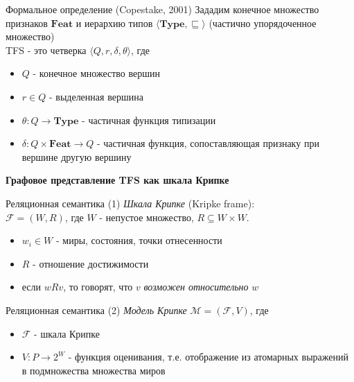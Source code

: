 \documentclass{beamer}
\begin{document}
\begin{frame}{Формальное определение (Copestake, 2001)}
Зададим конечное множество признаков $\textbf{Feat}$ и иерархию типов $\langle \textbf{Type}, \sqsubseteq \rangle$ (частично упорядоченное множество)\\
\bigskip
TFS - это четверка $\langle Q, r, \delta, \theta \rangle$, где
\begin{itemize}
	\item $Q$ - конечное множество вершин
	\item $r \in Q$ - выделенная вершина
	\item $\theta : Q \to \textbf{Type}$ - частичная функция типизации
	\item $\delta : Q \times \textbf{Feat} \to Q$ - частичная функция, сопоставляющая признаку при вершине другую вершину
\end{itemize}
\end{frame}

\begin{frame}{}
\begin{center}
	\textbf{Графовое представление TFS как шкала Крипке}
\end{center}
\end{frame}

\begin{frame}{Реляционная семантика (1)}
\textit{Шкала Крипке} (Kripke frame):\\
\bigskip
$\mathcal{F} = (W, R)$, где $W$ - непустое множество, $R \subseteq W \times W$.\\
\bigskip
\begin{itemize}
  \item $w_i \in W$ - миры, состояния, точки отнесенности
  \item $R$ - отношение достижимости
  \item если $wRv$, то говорят, что $v$ \textit{возможен относительно} $w$
\end{itemize}
\end{frame}

\begin{frame}{Реляционная семантика (2)}
\textit{Модель Крипке} $\mathcal{M} = (\mathcal{F}, V)$, где  
\bigskip
\begin{itemize}
  \item $\mathcal{F}$ - шкала Крипке
  \item $V : P \to 2^W$ - функция оценивания, т.е. отображение из атомарных выражений в подмножества множества миров
\end{itemize}
\bigskip
\end{frame}
\end{document}
